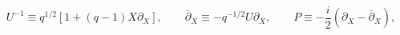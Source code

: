 \begin{equation}
\label{Eq:scaling}
U^{-1}\equiv q^{1/2}[1+(q-1)X\partial_X], \qquad
\bar\partial_X\equiv -q^{-1/2}U\partial_X, \qquad
P\equiv -\frac{i}{2}(\partial_X-\bar\partial_X),
\end{equation}

